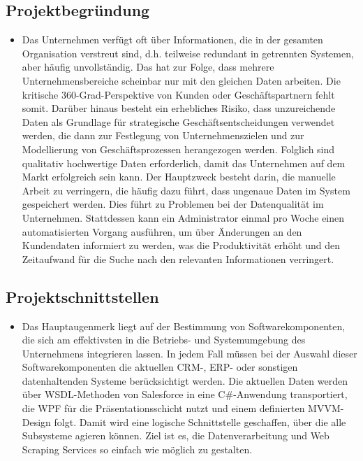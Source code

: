 \subsection{Projektbegr\"undung} 
\label{sec:Projektbegruendung}
\begin{itemize}
  \item	Das Unternehmen verf\"ugt oft \"uber Informationen, die in der gesamten Organisation verstreut sind, d.h. teilweise redundant in getrennten Systemen, aber h\"aufig unvollst\"andig.
	Das hat zur Folge, dass mehrere Unternehmensbereiche scheinbar nur mit den gleichen Daten arbeiten. 
	Die kritische 360-Grad-Perspektive von Kunden oder Gesch\"aftspartnern fehlt somit. 
	Dar\"uber hinaus besteht ein erhebliches Risiko, dass unzureichende Daten als Grundlage f\"ur strategische Gesch\"aftsentscheidungen verwendet werden, die dann zur Festlegung von Unternehmenszielen und zur Modellierung von Gesch\"aftsprozessen herangezogen werden. 
	Folglich sind qualitativ hochwertige Daten erforderlich, damit das Unternehmen auf dem Markt erfolgreich sein kann. Der Hauptzweck besteht darin, die manuelle Arbeit zu verringern, die h\"aufig dazu f\"uhrt, dass ungenaue Daten im System gespeichert werden. 
    Dies f\"uhrt zu Problemen bei der Datenqualit\"at im Unternehmen. 
	Stattdessen kann ein Administrator einmal pro Woche einen automatisierten Vorgang ausf\"uhren, um \"uber \"Anderungen an den Kundendaten informiert zu werden, was die Produktivit\"at erh\"oht und den Zeitaufwand f\"ur die Suche nach den relevanten Informationen verringert.

\end{itemize}

\subsection{Projektschnittstellen} 
\label{sec:Projektschnittstellen}
\begin{itemize} 
  \item Das Hauptaugenmerk liegt auf der Bestimmung von Softwarekomponenten, die sich am effektivsten in die Betriebs- und Systemumgebung des Unternehmens integrieren lassen.
	In jedem Fall m\"ussen bei der Auswahl dieser Softwarekomponenten die aktuellen CRM-, ERP- oder sonstigen datenhaltenden Systeme ber\"ucksichtigt werden. 
	Die aktuellen Daten werden \"uber WSDL-Methoden von Salesforce in eine C\#-Anwendung transportiert, die WPF f\"ur die Pr\"asentationsschicht nutzt und einem definierten MVVM-Design folgt. 
	Damit wird eine logische Schnittstelle geschaffen, \"uber die alle Subsysteme agieren k\"onnen. Ziel ist es, die Datenverarbeitung und Web Scraping Services so einfach wie m\"oglich zu gestalten.
\end{itemize}


